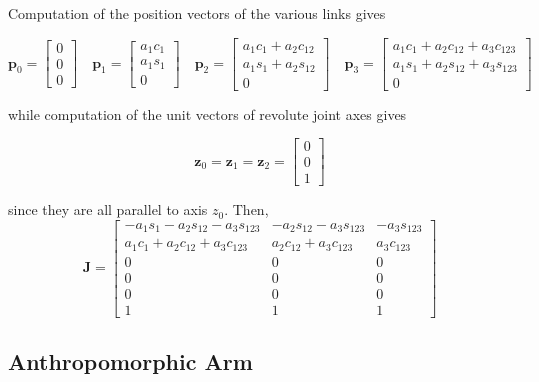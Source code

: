 \documentclass[10pt]{article}
\begin{document}
Computation of the position vectors of the various links gives

$$
\boldsymbol{p}_{0}=\left[\begin{array}{l}
0 \\
0 \\
0
\end{array}\right] \quad \boldsymbol{p}_{1}=\left[\begin{array}{c}
a_{1} c_{1} \\
a_{1} s_{1} \\
0
\end{array}\right] \quad \boldsymbol{p}_{2}=\left[\begin{array}{c}
a_{1} c_{1}+a_{2} c_{12} \\
a_{1} s_{1}+a_{2} s_{12} \\
0
\end{array}\right]
\quad
\boldsymbol{p}_{3}=\left[\begin{array}{c}
a_{1} c_{1}+a_{2} c_{12}+a_{3} c_{123} \\
a_{1} s_{1}+a_{2} s_{12}+a_{3} s_{123} \\
0
\end{array}\right]
$$


while computation of the unit vectors of revolute joint axes gives

$$
\boldsymbol{z}_{0}=\boldsymbol{z}_{1}=\boldsymbol{z}_{2}=\left[\begin{array}{l}
0 \\
0 \\
1
\end{array}\right]
$$

since they are all parallel to axis $z_{0}$. Then,
$$
\boldsymbol{J}=\left[\begin{array}{ccc}
-a_{1} s_{1}-a_{2} s_{12}-a_{3} s_{123} & -a_{2} s_{12}-a_{3} s_{123} & -a_{3} s_{123} \\
a_{1} c_{1}+a_{2} c_{12}+a_{3} c_{123} & a_{2} c_{12}+a_{3} c_{123} & a_{3} c_{123} \\
0 & 0 & 0 \\
0 & 0 & 0 \\
0 & 0 & 0 \\
1 & 1 & 1
\end{array}\right]
$$



\subsection{Anthropomorphic Arm}
\end{document}

